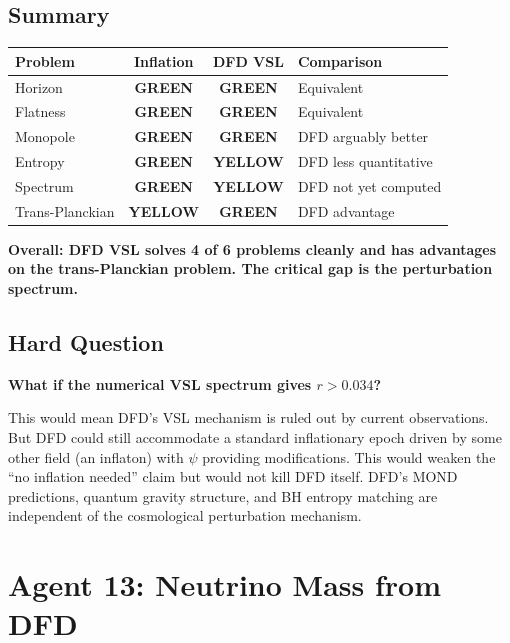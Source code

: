 \documentclass[11pt,a4paper]{article}
\newcommand{\GREEN}{\textcolor{dfdgreen}{\textbf{GREEN}}}
\newcommand{\YELLOW}{\textcolor{dfdyellow}{\textbf{YELLOW}}}
\begin{document}
\subsection{Summary}

\begin{center}
\begin{tabular}{lccl}
\toprule
\textbf{Problem} & \textbf{Inflation} & \textbf{DFD VSL} & \textbf{Comparison} \\
\midrule
Horizon & \GREEN & \GREEN & Equivalent \\
Flatness & \GREEN & \GREEN & Equivalent \\
Monopole & \GREEN & \GREEN & DFD arguably better \\
Entropy & \GREEN & \YELLOW & DFD less quantitative \\
Spectrum & \GREEN & \YELLOW & DFD not yet computed \\
Trans-Planckian & \YELLOW & \GREEN & DFD advantage \\
\bottomrule
\end{tabular}
\end{center}

\textbf{Overall: DFD VSL solves 4 of 6 problems cleanly and has advantages on the trans-Planckian problem. The critical gap is the perturbation spectrum.}

\subsection{Hard Question}

\textbf{What if the numerical VSL spectrum gives $r > 0.034$?}

This would mean DFD's VSL mechanism is ruled out by current observations. But DFD could still accommodate a standard inflationary epoch driven by some other field (an inflaton) with $\psi$ providing modifications. This would weaken the ``no inflation needed'' claim but would not kill DFD itself. DFD's MOND predictions, quantum gravity structure, and BH entropy matching are independent of the cosmological perturbation mechanism.

\newpage
\section{Agent 13: Neutrino Mass from DFD}
\label{sec:agent13}
\end{document}
